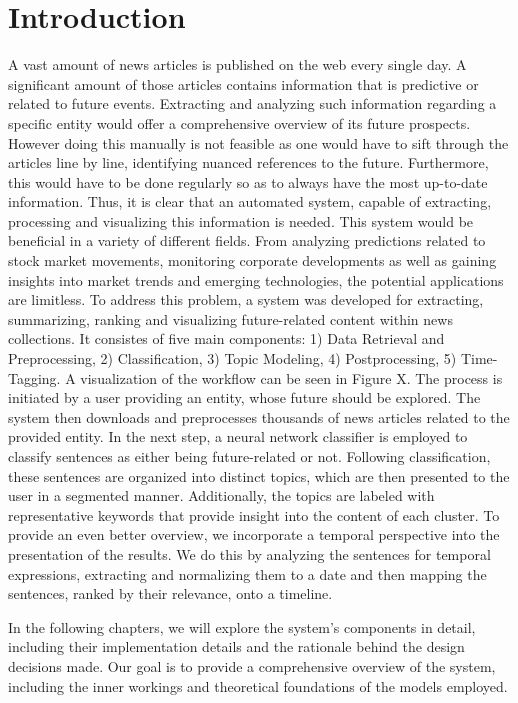 \documentclass[a4paper,10pt]{report} %
\begin{document}
\chapter{Introduction}
A vast amount of news articles is published on the web every single day. A significant amount of those articles contains information that is predictive or related to future events. Extracting and analyzing such information regarding a specific entity would offer a comprehensive overview of its future prospects. However doing this manually is not feasible as one would have to sift through the articles line by line, identifying nuanced references to the future. Furthermore, this would have to be done regularly so as to always have the most up-to-date information. Thus, it is clear that an automated system, capable of extracting, processing and visualizing this information is needed. This system would be beneficial in a variety of different fields. From analyzing predictions related to stock market movements, monitoring corporate developments as well as gaining insights into market trends and emerging technologies, the potential applications are limitless. To address this problem, a system was developed for extracting, summarizing, ranking and visualizing future-related content within news collections. It consistes of five main components: 1) Data Retrieval and Preprocessing, 2) Classification, 3) Topic Modeling, 4) Postprocessing, 5) Time-Tagging. A visualization of the workflow can be seen in Figure X.
The process is initiated by a user providing an entity, whose future should be explored. The system then downloads and preprocesses thousands of news articles related to the provided entity. In the next step, a neural network classifier is employed to classify sentences as either being future-related or not. Following classification, these sentences are organized into distinct topics, which are then presented to the user in a segmented manner. Additionally, the topics are labeled with representative keywords that provide insight into the content of each cluster. To provide an even better overview, we incorporate a temporal perspective into the presentation of the results. We do this by analyzing the sentences for temporal expressions, extracting and normalizing them to a date and then mapping the sentences, ranked by their relevance, onto a timeline. 

In the following chapters, we will explore the system's components in detail, including their implementation details and the rationale behind the design decisions made. Our goal is to provide a comprehensive overview of the system, including the inner workings and theoretical foundations of the models employed.
\end{document}
